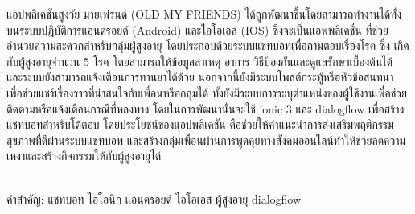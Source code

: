 \begin{thaiabstract}
    แอปพลิเคชันสูงวัย มายเฟรนด์ (OLD MY FRIENDS) ได้ถูกพัฒนาขึ้นโดยสามารถทำงานได้ทั้งบนระบบปฏิบัติการแอนดรอยด์ (Android) และไอโอเอส (IOS) 
    ซึ่งจะเป็นแอพพลิเคชั่น ที่ช่วยอำนวยความสะดวกสำหรับกลุ่มผู้สูงอายุ โดยประกอบด้วยระบบแชทบอทเพื่อถามตอบเรื่องโรค ซี่ง
    เกิดกับผู้สูงอายุจำนวน 5 โรค โดยสามารถให้ข้อมูลสาเหตุ อาการ วิธีป้องกันและดูแลรักษาเบื้องต้นได้ 
    และระบบยังสามารถแจ้งเตือนการทานยาได้ด้วย
    นอกจากนี้ยังมีระบบโพสต์กระทู้หรือหัวข้อสนทนา เพื่อช่วยแชร์เรื่องราวที่น่าสนใจกับเพื่อนหรือกลุ่มได้ 
    ทั้งยังมีระบบการระบุตำแหน่งของผู้ใช้งานเพื่อช่วยติดตามหรือแจ้งเตือนกรณีที่หลงทาง โดยในการพัฒนานั้นจะใช้ ionic 3 
    และ dialogflow เพื่อสร้างแชทบอทสำหรับโต้ตอบ โดยประโยชน์ของแอปพลิเคชัน 
    คือช่วยให้คำแนะนำการส่งเสริมพฤติกรรมสุขภาพที่ดีผ่านระบบแชทบอท และสร้างกลุ่มเพื่อนผ่านการพูดคุยทางสังคมออนไลน์ทำให้ช่วยลดความเหงาและสร้างกิจกรรมให้กับผู้สูงอายุได้

\noindent
\\คำสำคัญ: แชทบอท ไอโอนิก แอนดรอยด์ ไอโอเอส ผู้สูงอายุ dialogflow
\end{thaiabstract}
